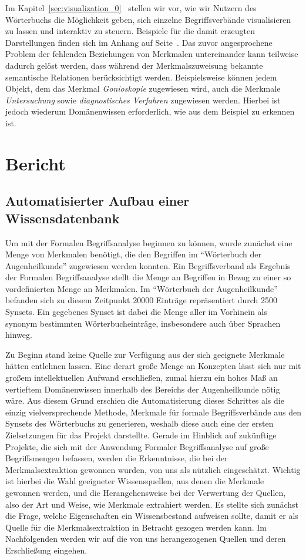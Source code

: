 \documentclass[pagesize,paper=A4,DIV=calc,fontsize=12pt,draft=false]{scrreprt}
\begin{document}
Im Kapitel~\ref{sec:visualization_0}\emph{~} stellen wir vor, wie wir Nutzern des Wörterbuchs die Möglichkeit geben, sich einzelne Begriffsverbände visualisieren zu lassen und interaktiv zu steuern.
Beispiele für die damit erzeugten Darstellungen finden sich im Anhang auf Seite~\pageref{sec:visualization_01}. 
Das zuvor angesprochene Problem der fehlenden Beziehungen von Merkmalen untereinander kann teilweise dadurch gelöst werden, dass während der Merkmalszuweisung bekannte semantische Relationen berücksichtigt werden. 
Beispielsweise können jedem Objekt, dem das Merkmal \emph{Gonioskopie} zugewiesen wird, auch die Merkmale \emph{Untersuchung} sowie \emph{diagnostisches Verfahren} zugewiesen werden. 
Hierbei ist jedoch wiederum Domänenwissen erforderlich, wie aus dem Beispiel zu erkennen ist. 

\chapter{Bericht}

\section{Automatisierter Aufbau einer Wissensdatenbank}

Um mit der Formalen Begriffsanalyse beginnen zu können, wurde zunächst eine Menge von Merkmalen benötigt, die den Begriffen im \enquote{Wörterbuch der Augenheilkunde} zugewiesen werden konnten. 
Ein Begriffsverband als Ergebnis der Formalen Begriffsanalyse stellt die Menge an Begriffen in Bezug zu einer so vordefinierten Menge an Merkmalen. 
Im \enquote{Wörterbuch der Augenheilkunde} befanden sich zu diesem Zeitpunkt 20000 Einträge repräsentiert durch 2500 Synsets. 
Ein gegebenes Synset ist dabei die Menge aller im Vorhinein als synonym bestimmten Wörterbucheinträge, insbesondere auch über Sprachen hinweg. 

Zu Beginn stand keine Quelle zur Verfügung aus der sich geeignete Merkmale hätten entlehnen lassen. 
Eine derart große Menge an Konzepten lässt sich nur mit großem intellektuellen Aufwand erschließen, zumal hierzu ein hohes Maß an vertieftem Domänenwissen innerhalb des Bereichs der Augenheilkunde nötig wäre. 
Aus diesem Grund erschien die Automatisierung dieses Schrittes als die einzig vielversprechende Methode, Merkmale für formale Begriffsverbände aus den Synsets des Wörterbuchs zu generieren, weshalb diese auch eine der ersten Zielsetzungen für das Projekt darstellte. 
Gerade im Hinblick auf zukünftige Projekte, die sich mit der Anwendung Formaler Begriffsanalyse auf große Begriffsmengen befassen, werden die Erkenntnisse, die bei der Merkmalsextraktion gewonnen wurden, von uns als nützlich eingeschätzt. 
Wichtig ist hierbei die Wahl geeigneter Wissensquellen, aus denen die Merkmale gewonnen werden, und die Herangehensweise bei der Verwertung der Quellen, also der Art und Weise, wie Merkmale extrahiert werden. 
Es stellte sich zunächst die Frage, welche Eigenschaften ein Wissensbestand aufweisen sollte, damit er als Quelle für die Merkmalsextraktion in Betracht gezogen werden kann. 
Im Nachfolgenden werden wir auf die von uns herangezogenen Quellen und deren Erschließung eingehen.
\end{document}
